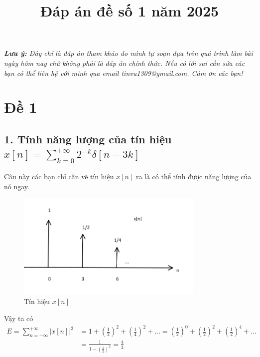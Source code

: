 \documentclass{article}
\title{Đáp án đề số 1 năm 2025}
\begin{document}
\maketitle
\textit{\textbf{Lưu ý:} Đây chỉ là đáp án tham khảo do mình tự soạn dựa trên quá trình làm bài ngày hôm nay chứ không phải là đáp án chính thức. Nếu có lỗi sai cần sửa các bạn có thể liên hệ với mình qua email tinvu1309@gmail.com. Cảm ơn các bạn!}
\section*{Đề 1}
\subsection*{1. Tính năng lượng của tín hiệu $x[n]=\sum_{k=0}^{+\infty}2^{-k}\delta[n-3k]$}
Câu này các bạn chỉ cần vẽ tín hiệu $x[n]$ ra là có thể tính được năng lượng của nó ngay.
\begin{figure}[H]
    \centering
    \includegraphics[width=0.8\textwidth]{1.png}
    \caption{Tín hiệu $x[n]$}
    \label{dongco}
\end{figure}
Vậy ta có 
\begin{equation*}
\begin{split}
E=\sum_{n=-\infty}^{+\infty}|x[n]|^{2}&=1+\left(\frac{1}{2}\right)^{2}+\left(\frac{1}{4}\right)^{2}+...=\left(\frac{1}{2}\right)^{0}+\left(\frac{1}{2}\right)^{2}+\left(\frac{1}{2}\right)^{4}+...\\&=\frac{1}{1-\left(\frac{1}{2}\right)^{2}}=\frac{4}{3}
\end{split}
\end{equation*}
\end{document}
